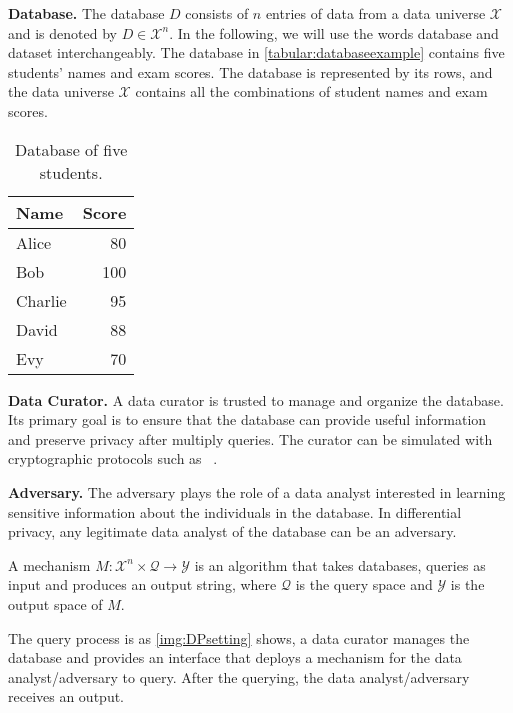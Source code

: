 \textbf{Database.} The database $D$ consists of $n$ entries of data from a data universe $\mathcal{X}$ and is denoted by $D\in \mathcal{X}^{n}$. In the following, we will use the words database and dataset interchangeably.
The database in \autoref{tabular:databaseexample} contains five students' names and exam scores. The database is represented by its rows, and the data universe $\mathcal{X}$ contains all the combinations of student names and exam scores.

\begin{table}[tbh!]
    \centering
    \begin{tabular}{|l|r|}
        \hline
        Name    & Score \\
        \hline
        Alice   & 80    \\
        \hline
        Bob     & 100   \\
        \hline
        Charlie & 95    \\
        \hline
        David   & 88    \\
        \hline
        Evy     & 70    \\
        \hline
    \end{tabular}
    \caption{Database of five students.}
    \label{tabular:databaseexample}
\end{table}
\FloatBarrier


\textbf{Data Curator.} A data curator is trusted to manage and organize the database. Its primary goal is to ensure that the database can provide useful information and preserve privacy after multiply queries. The curator can be simulated with cryptographic protocols such as \smpc~\cite{goldreich1987play}.

\textbf{Adversary.} The adversary plays the role of a data analyst interested in learning sensitive information about the individuals in the database. In differential privacy, any legitimate data analyst of the database can be an adversary.

\begin{definition}
    A mechanism $M:\mathcal{X}^{n}\times \mathcal{Q}\rightarrow \mathcal{Y}$ is an algorithm that takes databases, queries as input and produces an output string,
    where $\mathcal{Q}$ is the query space and $\mathcal{Y}$ is the output space of $M$.
\end{definition}
The query process is as \autoref{img:DPsetting} shows, a data curator manages the database and provides an interface that deploys a mechanism for the data analyst/adversary to query. After the querying, the data analyst/adversary receives an output.

